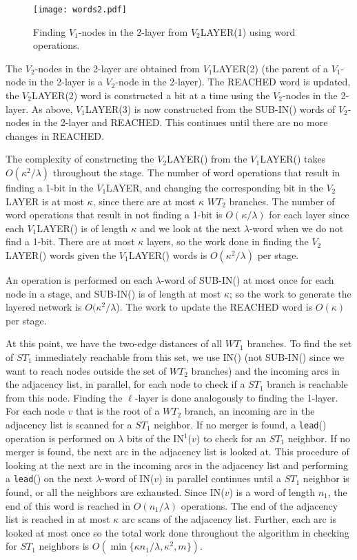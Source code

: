 \documentclass{article}
\begin{document}
\begin{figure}[t]
\centerline{\texttt{[image: words2.pdf]}}
\caption{\label{fig:words2}Finding $V_1$-nodes in the 2-layer from $V_2$LAYER(1) using word operations.}
\end{figure}

The $V_2$-nodes in the 2-layer are obtained from $V_1$LAYER(2) (the parent of a $V_1$-node in the 2-layer is a $V_2$-node in the 2-layer). The REACHED word is updated, the $V_2$LAYER(2) word is constructed a bit at a time using the $V_2$-nodes in the 2-layer. As above, $V_1$LAYER(3) is now constructed from the SUB-IN() words of $V_2$-nodes in the 2-layer and REACHED. This continues until there are no more changes in REACHED.

The complexity of constructing the $V_2$LAYER() from the $V_1$LAYER() takes $O(\kappa^2/\lambda)$ throughout the stage. The number of word operations that result in finding a 1-bit in the $V_1$LAYER, and changing the corresponding bit in the $V_2$LAYER is at most $\kappa$, since there are at most $\kappa$ $WT_2$ branches. The number of word operations that result in not finding a 1-bit is $O(\kappa/\lambda)$ for each layer since each $V_1$LAYER() is of length $\kappa$ and we look at the next $\lambda$-word when we do not find a 1-bit. There are at most $\kappa$ layers, so the work done in finding the $V_2$LAYER() words given the $V_1$LAYER() words is $O(\kappa^2/\lambda)$ per stage.

An operation is performed on each $\lambda$-word of SUB-IN() at most once for each node in a stage, and SUB-IN() is of length at most $\kappa$; so the work to generate the layered network is $O(\kappa^2/\lambda$). The work to update the REACHED word is $O(\kappa)$ per stage.

At this point, we have the two-edge distances of all $WT_1$ branches.
To find the set of $ST_1$ immediately reachable from this set, we use
IN() (not SUB-IN() since we want to reach nodes outside the set of
$WT_2$ branches) and the incoming arcs in the adjacency list, in
parallel, for each node to check if a $ST_1$ branch is reachable from
this node. Finding the $\ell$-layer is done analogously to finding the
1-layer. For each node $v$ that is the root of a $WT_2$ branch, an
incoming arc in the adjacency list is scanned for a $ST_1$ neighbor. If
no merger is found, a {\tt lead}() operation is performed on $\lambda$
bits of the IN$^1$($v$) to check for an $ST_1$ neighbor. If no merger
is found, the next arc in the adjacency list is looked at. This
procedure of looking at the next arc in the incoming arcs in the
adjacency list and performing a {\tt lead}() on the next $\lambda$-word
of IN($v$) in parallel continues until a $ST_1$ neighbor is found, or
all the neighbors are exhausted. Since IN($v$) is a word of length
$n_1$, the end of this word is reached in $O(n_1/\lambda)$ operations.
The end of the adjacency list is reached in at most $\kappa$ arc scans
of the adjacency list. Further, each arc is looked at most once so the
total work done throughout the algorithm in checking for $ST_1$
neighbors is $O(\min\{\kappa n_1/\lambda, \kappa^2, m\})$.
\end{document}
